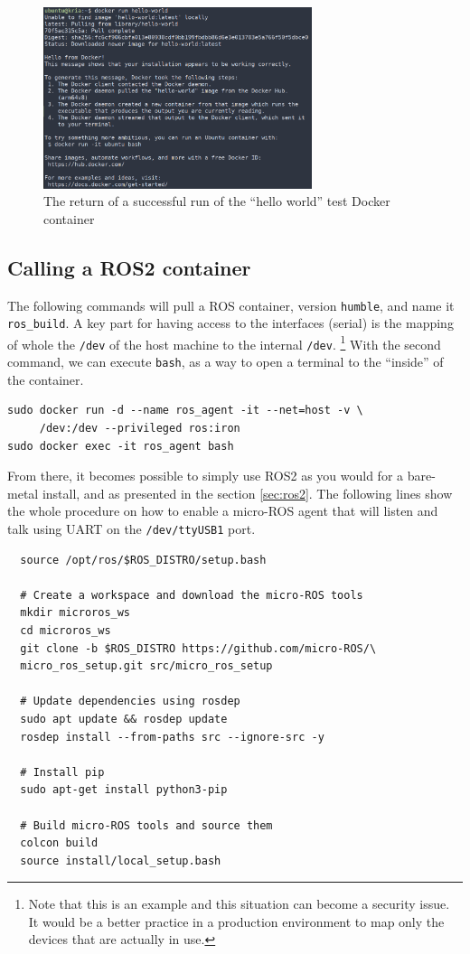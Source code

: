 \documentclass[10pt]{article}
\begin{document}
\begin{figure}[H]
  \centering
  \includegraphics[width=0.7\textwidth]{./img/hello-docker.png}
  \caption{The return of a successful run of the ``hello world'' test Docker container}
  \label{fig:hello-docker}
\end{figure}

\subsection{Calling a ROS2 container}
The following commands will pull a ROS container, version \verb|humble|, and name it \verb|ros_build|.
A key part for having access to the interfaces (serial) is the mapping of whole the \verb|/dev| of  the host machine to the
internal \verb|/dev|. \footnote{Note that this is an example and this situation can become a security issue. It would be a better practice
in a production environment to map only the devices that are actually in use.}
With the second command, we can execute \verb|bash|, as a way to open a terminal to the ``inside'' of the container.
\begin{tcolorbox}
\begin{verbatim}
sudo docker run -d --name ros_agent -it --net=host -v \
     /dev:/dev --privileged ros:iron
sudo docker exec -it ros_agent bash
\end{verbatim}
\end{tcolorbox}

From there, it becomes possible to simply use ROS2 as you would for a bare-metal install, and as presented in the section \ref{sec:ros2}.
The following lines show the whole procedure on how to enable a micro-ROS agent that will listen and talk using UART on the \verb|/dev/ttyUSB1| port.
\begin{tcolorbox}
\begin{verbatim}
  source /opt/ros/$ROS_DISTRO/setup.bash

  # Create a workspace and download the micro-ROS tools
  mkdir microros_ws
  cd microros_ws
  git clone -b $ROS_DISTRO https://github.com/micro-ROS/\
  micro_ros_setup.git src/micro_ros_setup

  # Update dependencies using rosdep
  sudo apt update && rosdep update
  rosdep install --from-paths src --ignore-src -y

  # Install pip
  sudo apt-get install python3-pip

  # Build micro-ROS tools and source them
  colcon build
  source install/local_setup.bash
\end{verbatim}
\end{tcolorbox}
\end{document}
